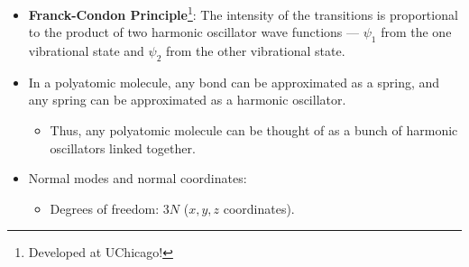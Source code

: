 \documentclass[../notes.tex]{subfiles}
\begin{document}
\begin{itemize}
\begin{figure}[h!]
\begin{subfigure}[b]{0.49\linewidth}
            \caption{Overlapping Gaussian wave packets.}
            \label{fig:electronicStatesb}
        \end{subfigure}
        \caption{Exciting between electronic states.}
        \label{fig:electronicStates}
    \end{figure}
    \begin{itemize}
        \item You can also do excitations from one potential energy surface to another.
        \item Recall that we have a Gaussian wave packet around the minimum energy on the PES.
        \item It's important that our Gaussian wave packets have some overlap for us to jump from one PES to the other.
        \item In Figure \ref{fig:electronicStatesb}, we'd expect a much higher probability of electronic transitions to the PES's with significant orbital overlap than from either to the third, where there is much less overlap.
    \end{itemize}
    \item \textbf{Franck-Condon Principle}\footnote{Developed at UChicago!}: The intensity of the transitions is proportional to the product of two harmonic oscillator wave functions --- $\psi_1$ from the one vibrational state and $\psi_2$ from the other vibrational state.
    \item In a polyatomic molecule, any bond can be approximated as a spring, and any spring can be approximated as a harmonic oscillator.
    \begin{itemize}
        \item Thus, any polyatomic molecule can be thought of as a bunch of harmonic oscillators linked together.
    \end{itemize}
    \item Normal modes and normal coordinates:
    \begin{itemize}
        \item Degrees of freedom: $3N$ ($x,y,z$ coordinates).

\end{itemize}
\end{itemize}
\end{document}
